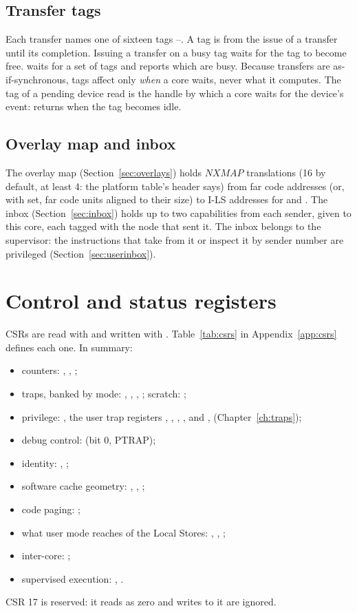 \subsection{Transfer tags}

Each transfer names one of sixteen tags --. A tag is  from the issue of a
transfer until its completion. Issuing a transfer on a busy tag waits for the tag to become free.
 waits for a set of tags and  reports which are busy. Because transfers are
as-if-synchronous, tags affect only \emph{when} a core waits, never what it computes. The tag of a
pending device read is the handle by which a core waits for the device's event:  returns when
the tag becomes idle.

\subsection{Overlay map and inbox}

The overlay map (Section~\ref{sec:overlays}) holds $\textit{NXMAP}$ translations (16 by default, at
least 4: the platform table's header says) from far code addresses (or, with  set, far code
units aligned to their size) to I-LS addresses for  and . The inbox (Section~\ref{sec:inbox}) holds up to two capabilities from each sender, given to
this core, each tagged with the node that sent it. The inbox belongs to the supervisor: the
instructions that take from it or inspect it by sender number are privileged
(Section~\ref{sec:userinbox}).

\section{Control and status registers}\label{sec:csrs}

CSRs are read with  and written with . Table~\ref{tab:csrs} in
Appendix~\ref{app:csrs} defines each one. In summary:
\begin{itemize}
\item counters: , , ;
\item traps, banked by mode: , , , ; scratch: ;
\item privilege: , the user trap registers , , ,
  , and ,  (Chapter~\ref{ch:traps});
\item debug control:  (bit 0, PTRAP);
\item identity: , ;
\item software cache geometry: , , ;
\item code paging: ;
\item what user mode reaches of the Local Stores: , , ;
\item inter-core: ;
\item supervised execution: , .
\end{itemize}
CSR 17 is reserved: it reads as zero and writes to it are ignored.

